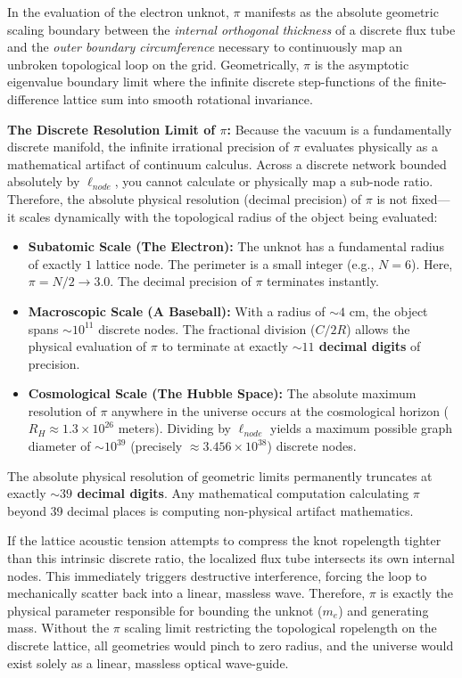 In the evaluation of the electron unknot, $\pi$ manifests as the absolute geometric scaling boundary between the \textit{internal orthogonal thickness} of a discrete flux tube and the \textit{outer boundary circumference} necessary to continuously map an unbroken topological loop on the grid. Geometrically, $\pi$ is the asymptotic eigenvalue boundary limit where the infinite discrete step-functions of the finite-difference lattice sum into smooth rotational invariance.

\textbf{The Discrete Resolution Limit of $\pi$:} Because the vacuum is a fundamentally discrete manifold, the infinite irrational precision of $\pi$ evaluates physically as a mathematical artifact of continuum calculus. Across a discrete network bounded absolutely by $\ell_{node}$, you cannot calculate or physically map a sub-node ratio. Therefore, the absolute physical resolution (decimal precision) of $\pi$ is not fixed—it scales dynamically with the topological radius of the object being evaluated:
\begin{itemize}
    \item \textbf{Subatomic Scale (The Electron):} The unknot has a fundamental radius of exactly $1$ lattice node. The perimeter is a small integer (e.g., $N=6$). Here, $\pi = N/2 \to 3.0$. The decimal precision of $\pi$ terminates instantly.
    \item \textbf{Macroscopic Scale (A Baseball):} With a radius of $\sim 4$ cm, the object spans $\sim 10^{11}$ discrete nodes. The fractional division ($C/2R$) allows the physical evaluation of $\pi$ to terminate at exactly \textbf{$\sim 11$ decimal digits} of precision.
    \item \textbf{Cosmological Scale (The Hubble Space):} The absolute maximum resolution of $\pi$ anywhere in the universe occurs at the cosmological horizon ($R_H \approx 1.3 \times 10^{26}$ meters). Dividing by $\ell_{node}$ yields a maximum possible graph diameter of $\sim 10^{39}$ (precisely $\approx 3.456\times10^{38}$) discrete nodes.
\end{itemize}

The absolute physical resolution of geometric limits permanently truncates at exactly \textbf{$\sim 39$ decimal digits}. Any mathematical computation calculating $\pi$ beyond 39 decimal places is computing non-physical artifact mathematics.

If the lattice acoustic tension attempts to compress the knot ropelength tighter than this intrinsic discrete ratio, the localized flux tube intersects its own internal nodes. This immediately triggers destructive interference, forcing the loop to mechanically scatter back into a linear, massless wave. Therefore, $\pi$ is exactly the physical parameter responsible for bounding the unknot ($m_e$) and generating mass. Without the $\pi$ scaling limit restricting the topological ropelength on the discrete lattice, all geometries would pinch to zero radius, and the universe would exist solely as a linear, massless optical wave-guide.

